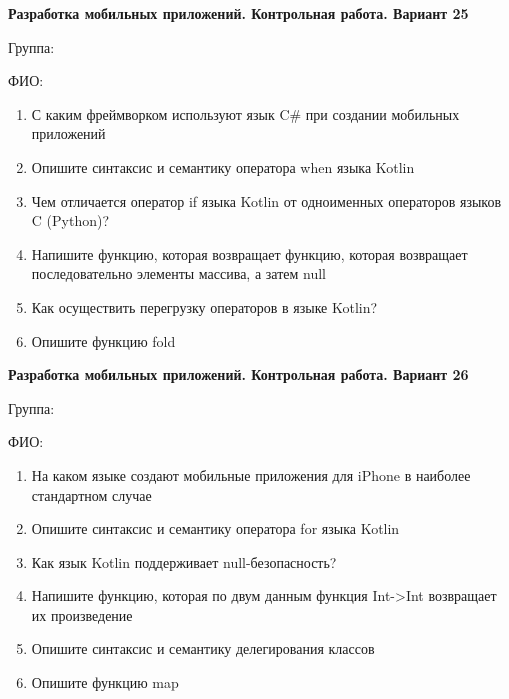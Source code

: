 \documentclass[12pt]{article}
\begin{document}
\newpage\begin{minipage}{\textwidth}
\textbf{Разработка мобильных приложений. Контрольная работа. Вариант 25}

Группа: \underline{\hspace{3cm}}

ФИО: \underline{\hspace{10cm}}

\begin{enumerate}
\item С каким фреймворком используют язык C\# при создании мобильных приложений
\item Опишите синтаксис и семантику оператора when языка Kotlin
\item Чем отличается оператор if языка Kotlin от одноименных операторов языков C (Python)?
\item Напишите функцию, которая возвращает функцию, которая возвращает последовательно элементы массива, а затем null
\item Как осуществить перегрузку операторов в языке Kotlin?
\item Опишите функцию fold

\end{enumerate}
\end{minipage}

\newpage\begin{minipage}{\textwidth}
\textbf{Разработка мобильных приложений. Контрольная работа. Вариант 26}

Группа: \underline{\hspace{3cm}}

ФИО: \underline{\hspace{10cm}}

\begin{enumerate}
\item На каком языке создают мобильные приложения для iPhone в наиболее стандартном случае
\item Опишите синтаксис и семантику оператора for языка Kotlin
\item Как язык Kotlin поддерживает null-безопасность?
\item Напишите функцию, которая по двум данным функция Int->Int возвращает их произведение
\item Опишите синтаксис и семантику делегирования классов
\item Опишите функцию map

\end{enumerate}
\end{minipage}
\end{document}
